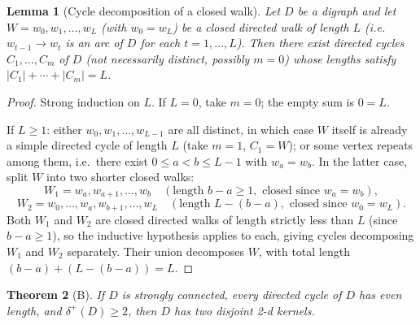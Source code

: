 \documentclass[11pt]{article}
\theoremstyle{plain}
\newtheorem{theorem}{Theorem}
\newtheorem{lemma}[theorem]{Lemma}
\begin{document}
\pagestyle{empty}

\begin{lemma}[Cycle decomposition of a closed walk]
\label{lem:decomp}
Let $D$ be a digraph and let $W = w_0, w_1, \dots, w_L$ (with $w_0 = w_L$) be a closed
directed walk of length $L$ (i.e.\ $w_{t-1} \to w_t$ is an arc of $D$ for each
$t = 1, \dots, L$). Then there exist directed cycles $C_1, \dots, C_m$ of $D$ (not
necessarily distinct, possibly $m=0$) whose lengths satisfy
$|C_1| + \cdots + |C_m| = L$.
\end{lemma}

\begin{proof}
Strong induction on $L$. If $L = 0$, take $m=0$; the empty sum is $0 = L$.

If $L \ge 1$: either $w_0, w_1, \dots, w_{L-1}$ are all distinct, in which case $W$
itself is already a simple directed cycle of length $L$ (take $m=1$, $C_1 = W$); or
some vertex repeats among them, i.e.\ there exist $0 \le a < b \le L-1$ with
$w_a = w_b$. In the latter case, split $W$ into two shorter closed walks:
\[
W_1 = w_a, w_{a+1}, \dots, w_b \quad (\text{length } b-a \ge 1, \text{ closed since } w_a = w_b),
\]
\[
W_2 = w_0, \dots, w_a, w_{b+1}, \dots, w_L \quad (\text{length } L - (b-a), \text{ closed since } w_0 = w_L).
\]
Both $W_1$ and $W_2$ are closed directed walks of length strictly less than $L$
(since $b - a \ge 1$), so the inductive hypothesis applies to each, giving cycles
decomposing $W_1$ and $W_2$ separately. Their union decomposes $W$, with total length
$(b-a) + (L-(b-a)) = L$.
\end{proof}

\begin{theorem}[B]
If $D$ is strongly connected, every directed cycle of $D$ has even length, and
$\delta^+(D) \ge 2$, then $D$ has two disjoint 2-d kernels.
\end{theorem}
\end{document}
